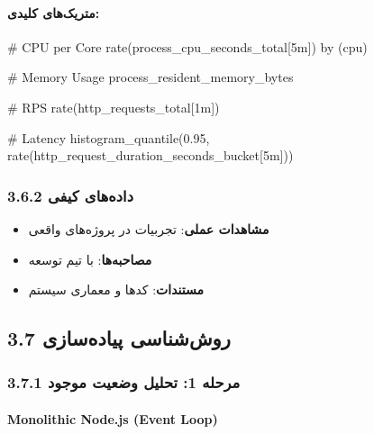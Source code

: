\documentclass[
]{article}
\newenvironment{Shaded}{}{}
\newcommand{\NormalTok}[1]{#1}
\providecommand{\tightlist}{%
  \setlength{\itemsep}{0pt}\setlength{\parskip}{0pt}}
\begin{document}
\paragraph{متریک‌های
کلیدی:}\label{ux645ux62aux631ux6ccux6a9ux647ux627ux6cc-ux6a9ux644ux6ccux62fux6cc-1}

\begin{Shaded}
\begin{Highlighting}[]
\NormalTok{\# CPU per Core}
\NormalTok{rate(process\_cpu\_seconds\_total[5m]) by (cpu)}

\NormalTok{\# Memory Usage}
\NormalTok{process\_resident\_memory\_bytes}

\NormalTok{\# RPS}
\NormalTok{rate(http\_requests\_total[1m])}

\NormalTok{\# Latency}
\NormalTok{histogram\_quantile(0.95, rate(http\_request\_duration\_seconds\_bucket[5m]))}
\end{Highlighting}
\end{Shaded}

\subsubsection{3.6.2 داده‌های
کیفی}\label{ux62fux627ux62fux647ux647ux627ux6cc-ux6a9ux6ccux641ux6cc}

\begin{itemize}
\tightlist
\item
  \textbf{مشاهدات عملی}: تجربیات در پروژه‌های واقعی
\item
  \textbf{مصاحبه‌ها}: با تیم توسعه
\item
  \textbf{مستندات}: کدها و معماری سیستم
\end{itemize}

\subsection{3.7 روش‌شناسی
پیاده‌سازی}\label{ux631ux648ux634ux634ux646ux627ux633ux6cc-ux67eux6ccux627ux62fux647ux633ux627ux632ux6cc}

\subsubsection{3.7.1 مرحله 1: تحلیل وضعیت
موجود}\label{ux645ux631ux62dux644ux647-1-ux62aux62dux644ux6ccux644-ux648ux636ux639ux6ccux62a-ux645ux648ux62cux648ux62f}

\paragraph{Monolithic Node.js (Event
Loop)}\label{monolithic-node.js-event-loop}
\end{document}
